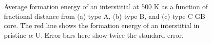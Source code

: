 \documentclass[review]{elsarticle}
\providecommand{\DIFaddbeginFL}{} %
\providecommand{\DIFaddendFL}{} %
\providecommand{\DIFdelbeginFL}{} %
\providecommand{\DIFdelendFL}{} %
\newcommand{\DIFscaledelfig}{0.5}
\newlength{\DIFdelgraphicswidth} %
\newlength{\DIFdelgraphicsheight} %
\newcommand{\DIFaddincludegraphics}[2][]{{\color{blue}\fbox{\DIFOincludegraphics[#1]{#2}}}} %
\newcommand{\DIFdelincludegraphics}[2][]{%
\sbox{\DIFdelgraphicsbox}{\DIFOincludegraphics[#1]{#2}}%
\settoboxwidth{\DIFdelgraphicswidth}{\DIFdelgraphicsbox} %
\settoboxtotalheight{\DIFdelgraphicsheight}{\DIFdelgraphicsbox} %
\scalebox{\DIFscaledelfig}{%
\parbox[b]{\DIFdelgraphicswidth}{\usebox{\DIFdelgraphicsbox}\\[-\baselineskip] \rule{\DIFdelgraphicswidth}{0em}}\llap{\resizebox{\DIFdelgraphicswidth}{\DIFdelgraphicsheight}{%
\setlength{\unitlength}{\DIFdelgraphicswidth}%
\begin{picture}(1,1)%
\thicklines\linethickness{2pt} %
{\color[rgb]{1,0,0}\put(0,0){\framebox(1,1){}}}%
{\color[rgb]{1,0,0}\put(0,0){\line( 1,1){1}}}%
{\color[rgb]{1,0,0}\put(0,1){\line(1,-1){1}}}%
\end{picture}%
}\hspace*{3pt}}} %
} %
\DeclareRobustCommand{\DIFaddbeginFL}{\DIFOaddbeginFL \let\includegraphics\DIFaddincludegraphics} %
\DeclareRobustCommand{\DIFaddendFL}{\DIFOaddendFL \let\includegraphics\DIFOincludegraphics} %
\DeclareRobustCommand{\DIFdelbeginFL}{\DIFOdelbeginFL \let\includegraphics\DIFdelincludegraphics} %
\DeclareRobustCommand{\DIFdelendFL}{\DIFOaddendFL \let\includegraphics\DIFOincludegraphics} %
\begin{document}
\begin{figure}[h!]
\centering
\DIFdelbeginFL %
\DIFdelendFL \DIFaddbeginFL {}
\DIFaddendFL \caption{Average formation energy of an interstitial at 500 K as a function of fractional distance from (a) type A, (b) type B, and (c) type C GB core. The red line shows the formation energy of an interstitial in pristine $\alpha$-U. Error bars here show twice the standard error.}
\label{fig:Seg_inter_500}
\end{figure}
\end{document}
